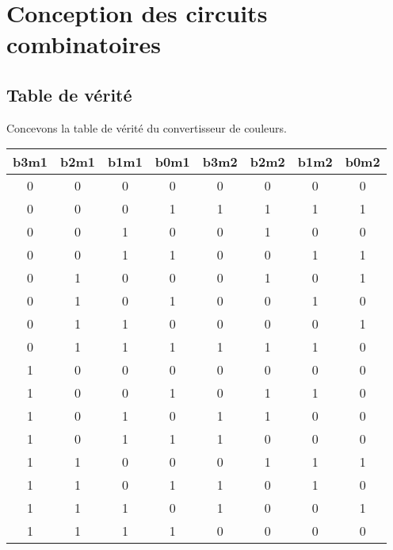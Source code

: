 \documentclass[12pt]{article}
\begin{document}



\section{Conception des circuits combinatoires}
\subsection{Table de vérité}
Concevons la table de vérité du convertisseur de couleurs.
\singlespacing
\begin{center}
	\begin{tabular}{|c|c|c|c||c|c|c|c|}
		\hline
		b3m1 & b2m1 & b1m1 & b0m1 & b3m2 & b2m2 & b1m2 & b0m2 \\ \hline
		0    & 0    & 0    & 0    & 0    & 0    & 0    & 0    \\ \hline
		0    & 0    & 0    & 1    & 1    & 1    & 1    & 1    \\ \hline
		0    & 0    & 1    & 0    & 0    & 1    & 0    & 0    \\ \hline
		0    & 0    & 1    & 1    & 0    & 0    & 1    & 1    \\ \hline
		0    & 1    & 0    & 0    & 0    & 1    & 0    & 1    \\ \hline
		0    & 1    & 0    & 1    & 0    & 0    & 1    & 0    \\ \hline
		0    & 1    & 1    & 0    & 0    & 0    & 0    & 1    \\ \hline
		0    & 1    & 1    & 1    & 1    & 1    & 1    & 0    \\ \hline
		1    & 0    & 0    & 0    & 0    & 0    & 0    & 0    \\ \hline
		1    & 0    & 0    & 1    & 0    & 1    & 1    & 0    \\ \hline
		1    & 0    & 1    & 0    & 1    & 1    & 0    & 0    \\ \hline
		1    & 0    & 1    & 1    & 1    & 0    & 0    & 0    \\ \hline
		1    & 1    & 0    & 0    & 0    & 1    & 1    & 1    \\ \hline
		1    & 1    & 0    & 1    & 1    & 0    & 1    & 0    \\ \hline
		1    & 1    & 1    & 0    & 1    & 0    & 0    & 1    \\ \hline
		1    & 1    & 1    & 1    & 0    & 0    & 0    & 0    \\ \hline
	\end{tabular}
\end{center}
\doublespacing
\end{document}
